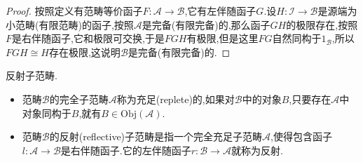 \begin{enumerate}
\begin{proof}
    	按照定义有范畴等价函子$F:\mathscr{A}\to\mathscr{B}$,它有左伴随函子$G$.设$H:\mathscr{I}\to\mathscr{B}$是源端为小范畴(有限范畴)的函子,按照$\mathscr{A}$是完备(有限完备)的,那么函子$GH$的极限存在,按照$F$是右伴随函子,它和极限可交换,于是$FGH$有极限,但是这里$FG$自然同构于$1_{\mathscr{B}}$,所以$FGH\cong H$存在极限,这说明$\mathscr{B}$是完备(有限完备)的.
    \end{proof}
\end{enumerate}

反射子范畴.
\begin{itemize}
	\item 范畴$\mathscr{B}$的完全子范畴$\mathscr{A}$称为充足(replete)的,如果对$\mathscr{B}$中的对象$B$,只要存在$\mathscr{A}$中对象同构于$B$,就有$B\in\mathrm{Obj}(\mathscr{A})$.
	\item 范畴$\mathscr{B}$的反射(reflective)子范畴是指一个完全充足子范畴$\mathscr{A}$,使得包含函子$l:\mathscr{A}\to\mathscr{B}$是右伴随函子.它的左伴随函子$r:\mathscr{B}\to\mathscr{A}$就称为反射.
\end{itemize}
